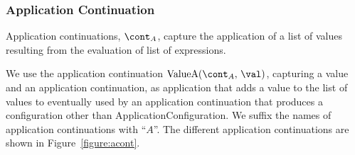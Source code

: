 \documentclass[a4paper,oneside,fleqn]{article}
\newcommand{\idmeta}{\ensuremath{\mathit{X}}}
\begin{document}
\subsubsection{Application Continuation}
\label{subsubsec:application-continuation}

Application continuations, $\acont$, capture the application of a list of values resulting from the evaluation of list of expressions.

\newcommand{\ValueA}[2]{\mathrm{ValueA}({#1},\,{#2})}
\newcommand{\StringConcatenationA}{\mathrm{StringConcatenationA(\econt)}}
\newcommand{\SuperMethodA}[1]{\mathrm{SuperMethodA}(\idmeta,\,\env,\,#1,\,\ExceptionHandlersRest,\,\econt)}
\newcommand{\StaticInvA}[4]{\mathrm{StaticInvocationA}({#1},\,{#2},\,{#3},\,\ExceptionHandlersRest,\,{#4})}
\newcommand{\DInstanceMethodA}{\mathrm{DInstanceMethodA}(\membermeta,\,\val,\,\ExceptionHandlers,\,\econt)}
\newcommand{\FieldsA}[4]{\mathrm{InstanceFieldsA}({#1},\,{#2},\,{#3},\,\strace,\,\handler,\,\cstrace,\,\cex,\,{#4})}
\newcommand{\SuperA}[3]{\mathrm{SuperA}({#1},\,{#2},\,\strace,\,\handler,\,\cstrace,\,\cex,\,{#3})}
\newcommand{\ConstructorA}[3]{\mathrm{ConstructorA}({#1},\,{#2},\,\handler,\,\cstrace,\,\cex,\,{#3})}
\newcommand{\RedirectingA}[3]{\mathrm{RedirectingA}({#1},\,{#2},\,\strace,\,\handler,\,\cstrace,\,\cex,\,{#3})}
\newcommand{\ForInitA}[1]{\mathrm{ForInitA}(\varmeta{s},\, #1,\, \exprs,\, \statementmeta,\, \env,\, \lbls,\, \clbls,\, \handler,\, \cstrace,\, \cex,\, \econt,\, \scont)}
\newcommand{\ForUpdatesA}[2]{\mathrm{ForUpdatesA}(\varmeta{s},\, #1,\, \exprs,\, \statementmeta,\, \env,\, #2,\, \lbls,\, \clbls,\, \handler,\, \cstrace,\, \cex,\, \econt,\, \scont)}
\newcommand{\InstanceMethodA}{\mathrm{InstanceMethodA(\idmeta,\,\val,\,\strace,\,\handler,\,\cstrace,\,\cex,\,\econt)}}

We use the application continuation $\ValueA{\acont}{\val}$, capturing a value and an application continuation, as application that adds a value to the list of values to eventually used by an application continuation that produces a configuration other than ApplicationConfiguration.
We suffix the names of application continuations with ``$A$''.
The different application continuations are shown in Figure~\ref{figure:acont}.
\end{document}
